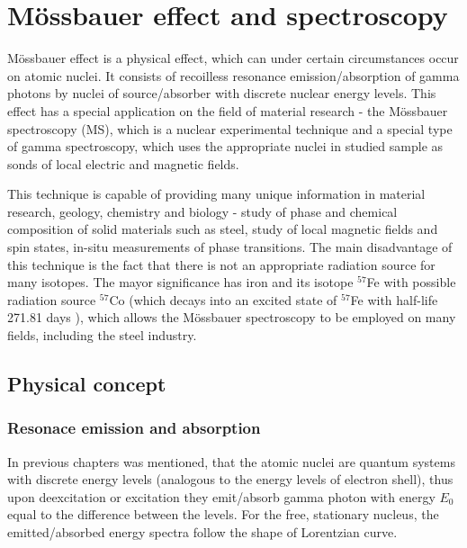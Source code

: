 
\chapter{Mössbauer effect and spectroscopy}
Mössbauer effect is a physical effect, which can under certain circumstances occur on atomic nuclei. It consists of recoilless resonance emission/absorption of gamma photons by nuclei of source/absorber with discrete nuclear energy levels. This effect has a special application on the field of material research - the Mössbauer spectroscopy (MS), which is a nuclear experimental technique and a special type of gamma spectroscopy, which uses the appropriate nuclei in studied sample as sonds of local electric and magnetic fields. 

\par
This technique is capable of providing many unique information in material research, geology, chemistry and biology - study of phase and chemical composition of solid materials such as steel, study of local magnetic fields and spin states, in-situ measurements of phase transitions. The main disadvantage of this technique is the fact that there is not an appropriate radiation source for many isotopes. The mayor significance has iron and its isotope $^{57}$Fe with possible radiation source $^{57}$Co (which decays into an excited state of $^{57}$Fe with half-life 271.81 days \cite{co57}), which allows the Mössbauer spectroscopy to be employed on many fields, including the steel industry.

\section{Physical concept}

\subsection{Resonace emission and absorption}
In previous chapters was mentioned, that the atomic nuclei are quantum systems with discrete energy levels (analogous to the energy levels of electron shell), thus upon deexcitation or excitation they emit/absorb gamma photon with energy $E_0$ equal to the difference between the levels. For the free, stationary nucleus, the emitted/absorbed energy spectra follow the shape of Lorentzian curve. 

